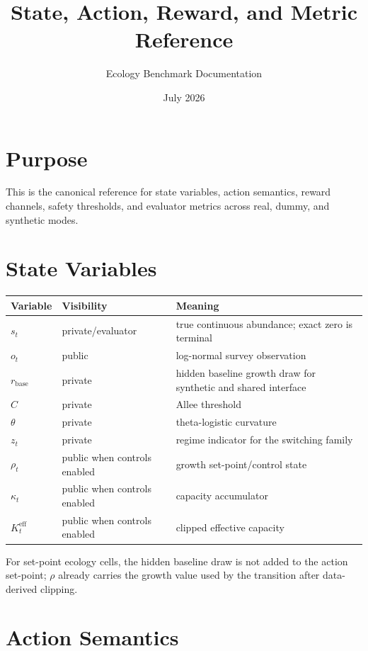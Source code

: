 \documentclass[11pt]{article}
\title{State, Action, Reward, and Metric Reference}
\author{Ecology Benchmark Documentation}
\date{July 2026}
\begin{document}
\maketitle

\section{Purpose}

This is the canonical reference for state variables, action semantics, reward
channels, safety thresholds, and evaluator metrics across real, dummy, and
synthetic modes.

\section{State Variables}

\begin{center}
\begin{tabularx}{\linewidth}{llX}
\toprule
Variable & Visibility & Meaning \\
\midrule
$s_t$ & private/evaluator & true continuous abundance; exact zero is terminal \\
$o_t$ & public & log-normal survey observation \\
$r_{\mathrm{base}}$ & private & hidden baseline growth draw for synthetic and shared interface \\
$C$ & private & Allee threshold \\
$\theta$ & private & theta-logistic curvature \\
$z_t$ & private & regime indicator for the switching family \\
$\rho_t$ & public when controls enabled & growth set-point/control state \\
$\kappa_t$ & public when controls enabled & capacity accumulator \\
$K^{\mathrm{eff}}_t$ & public when controls enabled & clipped effective capacity \\
\bottomrule
\end{tabularx}
\end{center}

For set-point ecology cells, the hidden baseline draw is not added to the action
set-point; $\rho$ already carries the growth value used by the transition after
data-derived clipping.

\section{Action Semantics}
\end{document}
